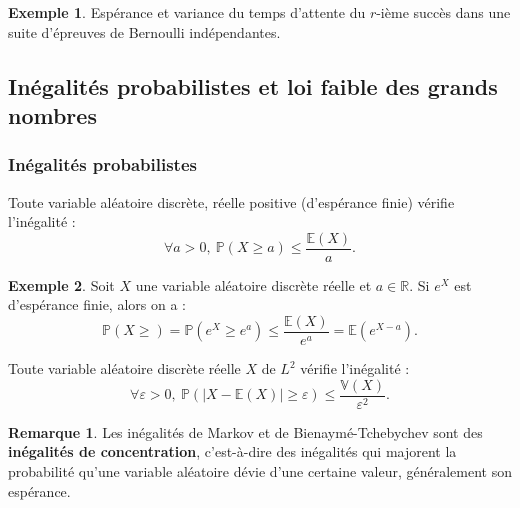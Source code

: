\documentclass[french]{article}
\renewcommand{\P}{\mathbb{P}}
\newcommand{\R}{\mathbb{R}}
\newcommand{\E}{\mathbb{E}}
\newcommand{\V}{\mathbb{V}}
\theoremstyle{plain}
\theoremstyle{definition}
\newtheorem*{ex}{Exemple}
\newtheorem*{rmq}{Remarque}
\theoremstyle{remark}
\begin{document}
\begin{ex}
	Espérance et variance du temps d'attente du $r$-ième succès dans une suite d'épreuves de Bernoulli indépendantes.
\end{ex}

\subsection{Inégalités probabilistes et loi faible des grands nombres}

\subsubsection*{Inégalités probabilistes}

\begin{thm}%
	Toute variable aléatoire discrète, réelle positive (d'espérance finie) vérifie l'inégalité :
	$$\forall a>0,\ \P(X\geqslant a)\leqslant\frac{\E(X)}{a}.$$
\end{thm}

\begin{ex}
	Soit $X$ une variable aléatoire discrète réelle et $a\in\R$. Si $e^X$ est d'espérance finie, alors on a :
	$$\P(X\geqslant)=\P(e^X\geqslant e^a)\leqslant\frac{\E(X)}{e^a}=\E(e^{X-a}).$$
\end{ex}

\begin{thm}
	Toute variable aléatoire discrète réelle $X$ de $L^2$ vérifie l'inégalité :
	$$\forall\varepsilon>0,\ \P(\lvert X-\E(X)\rvert\geqslant\varepsilon)\leqslant\frac{\V(X)}{\varepsilon^2}.$$
\end{thm}

\begin{rmq}
	Les inégalités de Markov et de Bienaymé-Tchebychev sont des \textbf{inégalités de concentration}, c'est-à-dire des inégalités qui majorent la probabilité qu'une variable aléatoire dévie d'une certaine valeur, généralement son espérance.
\end{rmq}
\end{document}
